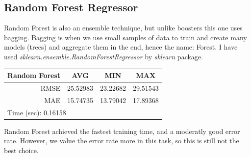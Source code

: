 \documentclass[11pt,reqno]{amsart}
\begin{document}
\subsection{Random Forest Regressor}
Random Forest is also an ensemble technique, but unlike boosters this one uses bagging. Bagging is when we use small samples of data to train and create many models (trees) and aggregate them in the end, hence the name: Forest. I have used \textit{sklearn.ensemble.RandomForestRegressor} by \textit{sklearn} package.
\begin{table}[]
\begin{tabular}{|c|l|l|l|}
\hline
Random Forest & \multicolumn{1}{c|}{AVG} & \multicolumn{1}{c|}{MIN} & \multicolumn{1}{c|}{MAX} \\ \hline
\multicolumn{1}{|r|}{RMSE} & 25.52983 & 23.22682 & 29.51543 \\ \hline
\multicolumn{1}{|r|}{MAE} & 15.74735 & 13.79042 & 17.89368 \\ \hline
\multicolumn{4}{|l|}{Time (sec): 0.16158} \\ \hline
\end{tabular}
\end{table}
Random Forest achieved the fastest training time, and a moderatly good error rate. However, we value the error rate more in this task, so this is still not the best choice.
\end{document}
